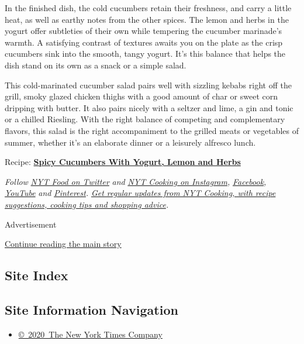In the finished dish, the cold cucumbers retain their freshness, and
carry a little heat, as well as earthy notes from the other spices. The
lemon and herbs in the yogurt offer subtleties of their own while
tempering the cucumber marinade's warmth. A satisfying contrast of
textures awaits you on the plate as the crisp cucumbers sink into the
smooth, tangy yogurt. It's this balance that helps the dish stand on its
own as a snack or a simple salad.

This cold-marinated cucumber salad pairs well with sizzling kebabs right
off the grill, smoky glazed chicken thighs with a good amount of char or
sweet corn dripping with butter. It also pairs nicely with a seltzer and
lime, a gin and tonic or a chilled Riesling. With the right balance of
competing and complementary flavors, this salad is the right
accompaniment to the grilled meats or vegetables of summer, whether it's
an elaborate dinner or a leisurely alfresco lunch.

Recipe:
\textbf{\href{https://cooking.nytimes3xbfgragh.onion/recipes/1021278-spicy-cucumbers-with-yogurt-lemon-and-herbs}{Spicy
Cucumbers With Yogurt, Lemon and Herbs}}

\emph{Follow} \href{https://twitter.com/nytfood}{\emph{NYT Food on
Twitter}} \emph{and}
\href{https://www.instagram.com/nytcooking/}{\emph{NYT Cooking on
Instagram}}\emph{,}
\href{https://www.facebookcorewwwi.onion/nytcooking/}{\emph{Facebook}}\emph{,}
\href{https://www.youtube.com/nytcooking}{\emph{YouTube}} \emph{and}
\href{https://www.pinterest.com/nytcooking/}{\emph{Pinterest}}\emph{.}
\href{https://www.nytimes3xbfgragh.onion/newsletters/cooking}{\emph{Get
regular updates from NYT Cooking, with recipe suggestions, cooking tips
and shopping advice}}\emph{.}

Advertisement

\protect\hyperlink{after-bottom}{Continue reading the main story}

\hypertarget{site-index}{%
\subsection{Site Index}\label{site-index}}

\hypertarget{site-information-navigation}{%
\subsection{Site Information
Navigation}\label{site-information-navigation}}

\begin{itemize}
\tightlist
\item
  \href{https://help.nytimes3xbfgragh.onion/hc/en-us/articles/115014792127-Copyright-notice}{©~2020~The
  New York Times Company}
\end{itemize}

